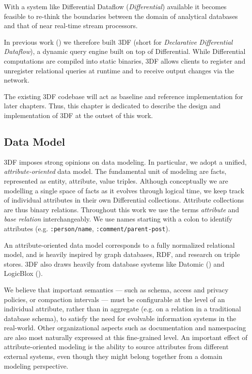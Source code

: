 \documentclass[../index.tex]{subfiles}
\begin{document}
With a system like Differential Dataflow (\emph{Differential})
available it becomes feasible to re-think the boundaries between the
domain of analytical databases and that of near real-time stream
processors.

In previous work (\cite{declarative}) we therefore built 3DF (short
for \emph{Declarative Differential Dataflow}), a dynamic query engine
built on top of Differential. While Differential computations are
compiled into static binaries, 3DF allows clients to register and
unregister relational queries at runtime and to receive output changes
via the network.

The existing 3DF codebase will act as baseline and reference
implementation for later chapters. Thus, this chapter is dedicated to
describe the design and implementation of 3DF at the outset of this
work.

\subsection{Data Model} \label{3df-data-model}

3DF imposes strong opinions on data modeling. In particular, we adopt
a unified, \emph{attribute-oriented} data model. The fundamental unit
of modeling are facts, represented as entity, attribute, value
triples. Although conceptually we are modelling a single space of
facts as it evolves through logical time, we keep track of individual
attributes in their own Differential collections. Attribute
collections are thus binary relations. Throughout this work we use the
terms \emph{attribute} and \emph{base relation} interchangeably. We
use names starting with a colon to identify attributes
(e.g. \texttt{:person/name}, \texttt{:comment/parent-post}).

An attribute-oriented data model corresponds to a fully normalized
relational model, and is heavily inspired by graph databases, RDF, and
research on triple stores. 3DF also draws heavily from database
systems like Datomic (\cite{datomic}) and LogicBlox
(\cite{aref2015design}).

We believe that important semantics — such as schema, access and
privacy policies, or compaction intervals — must be configurable at
the level of an individual attribute, rather than in aggregate
(e.g. on a relation in a traditional database schema), to satisfy the
need for evolvable information systems in the real-world. Other
organizational aspects such as documentation and namespacing are also
most naturally expressed at this fine-grained level. An important
effect of attribute-oriented modeling is the ability to source
attributes from different external systems, even though they might
belong together from a domain modeling perspective.
\end{document}
